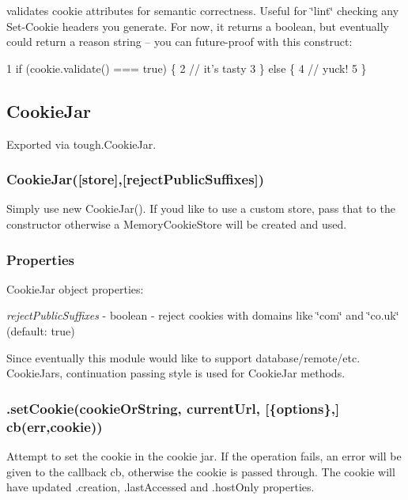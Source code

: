 validates cookie attributes for semantic correctness. Useful for \char`\"{}lint\char`\"{} checking any Set-\/\+Cookie headers you generate. For now, it returns a boolean, but eventually could return a reason string -- you can future-\/proof with this construct\+:


\begin{DoxyCode}
1 if (cookie.validate() === true) \{
2   // it's tasty
3 \} else \{
4   // yuck!
5 \}
\end{DoxyCode}


\subsection*{Cookie\+Jar}

Exported via {\ttfamily tough.\+Cookie\+Jar}.

\subsubsection*{{\ttfamily Cookie\+Jar(\mbox{[}store\mbox{]},\mbox{[}reject\+Public\+Suffixes\mbox{]})}}

Simply use {\ttfamily new Cookie\+Jar()}. If you\textquotesingle{}d like to use a custom store, pass that to the constructor otherwise a {\ttfamily Memory\+Cookie\+Store} will be created and used.

\subsubsection*{Properties}

Cookie\+Jar object properties\+:


\begin{DoxyItemize}
\item {\itshape reject\+Public\+Suffixes} -\/ boolean -\/ reject cookies with domains like \char`\"{}com\char`\"{} and \char`\"{}co.\+uk\char`\"{} (default\+: {\ttfamily true})
\end{DoxyItemize}

Since eventually this module would like to support database/remote/etc. Cookie\+Jars, continuation passing style is used for Cookie\+Jar methods.

\subsubsection*{{\ttfamily .set\+Cookie(cookie\+Or\+String, current\+Url, \mbox{[}\{options\},\mbox{]} cb(err,cookie))}}

Attempt to set the cookie in the cookie jar. If the operation fails, an error will be given to the callback {\ttfamily cb}, otherwise the cookie is passed through. The cookie will have updated {\ttfamily .creation}, {\ttfamily .last\+Accessed} and {\ttfamily .host\+Only} properties.

